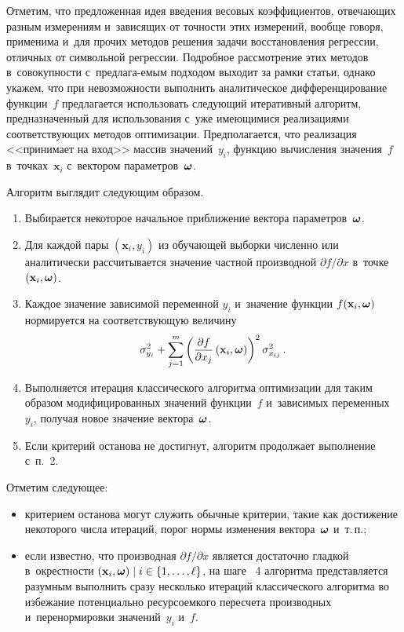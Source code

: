 \begin{multicols}{2}
Отметим, что предложенная идея введения весовых коэффициентов, отвечающих разным
измерениям и~зависящих от точности этих измерений, вообще говоря, применима 
и~для прочих методов решения задачи вос\-ста\-нов\-ле\-ния регрессии, отличных от символьной 
регрессии. Подробное рас\-смот\-ре\-ние этих методов в~совокупности с~предлага-\linebreak емым подходом 
выходит за рамки статьи, однако укажем, что при невозможности выполнить аналитическое
дифференцирование функции~$f$ предлагается использовать следующий
итеративный алгоритм, предназначенный для использования с~уже имеющимися
реализациями соответствующих методов оптимизации. Предполагается, что реализация
<<принимает на вход>> массив значений~$y_i$,
функцию вычисления значения~$f$ в~точках~$\mathbf{x}_i$ с~вектором па\-ра\-мет\-ров~$\boldsymbol{\omega}$.

Алгоритм выглядит следующим образом.
\begin{enumerate}[1.]
  \item Выбирается некоторое начальное приближение вектора па\-ра\-мет\-ров~$\boldsymbol{\omega}$.
  \item Для каждой пары $(\mathbf{x}_i, y_i)$ из обуча\-ющей выборки численно или
    аналитически рассчитывается значение част\-ной производной
    ${\partial f}/{\partial x}$ в~точке~$(\mathbf{x}_i, \boldsymbol{\omega})$.
  \item Каждое значение зависимой переменной $y_i$ и~значение функции 
$f(\mathbf{x}_i, \boldsymbol{\omega})$
    нормируется на соответствующую величину
$$
      \sigma_{y_i}^2 + \sum\limits_{j = 1}^m \left(\displaystyle\frac{\displaystyle \partial f\mathstrut}{\displaystyle \partial 
x_j\mathstrut}\left(\mathbf{x}_i, \boldsymbol{\omega}\right)\right)^2 \sigma^2_{x_{ij}}\,.
$$
  \item Выполняется итерация классического алгоритма оптимизации для таким 
образом модифицированных значений функции~$f$ и~зависимых переменных~$y_i$, 
получая     новое значение вектора~$\boldsymbol{\omega}$.
  \item Если критерий останова не достигнут, алгоритм продолжает выполнение 
  с~п.~2.
\end{enumerate}

Отметим следующее:
\begin{itemize}
  \item критерием останова могут служить обычные критерии, такие как достижение 
некоторого     числа итераций, порог нормы изменения вектора~$\boldsymbol{\omega}$ и~т.\,п.;
  \item если известно, что производная ${\partial f}/{\partial x}$ является 
достаточно гладкой в~окрестности $(\mathbf{x}_i, \bomega) \mid i \hm\in 
\{ 1, \dots, \ell \}$, 
на шаге ~4 алгоритма представляется разумным выполнить сразу несколько итераций
    классического алгоритма во избежание потенциально ресурсоемкого пересчета 
производных и~перенормировки значений~$y_i$ и~$f$.
\end{itemize}


\end{multicols}
